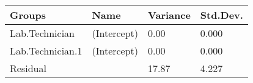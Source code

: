 \documentclass[12pt,]{article}
\begin{document}
\begin{longtable}[]{@{}llll@{}}
\toprule
\begin{minipage}[b]{0.21\columnwidth}\raggedright
Groups\strut
\end{minipage} & \begin{minipage}[b]{0.15\columnwidth}\raggedright
Name\strut
\end{minipage} & \begin{minipage}[b]{0.11\columnwidth}\raggedright
Variance\strut
\end{minipage} & \begin{minipage}[b]{0.11\columnwidth}\raggedright
Std.Dev.\strut
\end{minipage}\tabularnewline
\midrule
\endhead
\begin{minipage}[t]{0.21\columnwidth}\raggedright
Lab.Technician\strut
\end{minipage} & \begin{minipage}[t]{0.15\columnwidth}\raggedright
(Intercept)\strut
\end{minipage} & \begin{minipage}[t]{0.11\columnwidth}\raggedright
0.00\strut
\end{minipage} & \begin{minipage}[t]{0.11\columnwidth}\raggedright
0.000\strut
\end{minipage}\tabularnewline
\begin{minipage}[t]{0.21\columnwidth}\raggedright
Lab.Technician.1\strut
\end{minipage} & \begin{minipage}[t]{0.15\columnwidth}\raggedright
(Intercept)\strut
\end{minipage} & \begin{minipage}[t]{0.11\columnwidth}\raggedright
0.00\strut
\end{minipage} & \begin{minipage}[t]{0.11\columnwidth}\raggedright
0.000\strut
\end{minipage}\tabularnewline
\begin{minipage}[t]{0.21\columnwidth}\raggedright
Residual\strut
\end{minipage} & \begin{minipage}[t]{0.15\columnwidth}\raggedright
\strut
\end{minipage} & \begin{minipage}[t]{0.11\columnwidth}\raggedright
17.87\strut
\end{minipage} & \begin{minipage}[t]{0.11\columnwidth}\raggedright
4.227\strut
\end{minipage}\tabularnewline
\bottomrule
\end{longtable}
\end{document}
